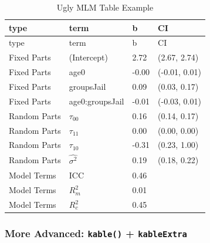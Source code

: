 \documentclass[]{article}
\newenvironment{Shaded}{\begin{snugshade}}{\end{snugshade}}
\newcommand{\KeywordTok}[1]{\textcolor[rgb]{0.13,0.29,0.53}{\textbf{#1}}}
\newcommand{\DataTypeTok}[1]{\textcolor[rgb]{0.13,0.29,0.53}{#1}}
\newcommand{\DecValTok}[1]{\textcolor[rgb]{0.00,0.00,0.81}{#1}}
\newcommand{\StringTok}[1]{\textcolor[rgb]{0.31,0.60,0.02}{#1}}
\newcommand{\CommentTok}[1]{\textcolor[rgb]{0.56,0.35,0.01}{\textit{#1}}}
\newcommand{\OperatorTok}[1]{\textcolor[rgb]{0.81,0.36,0.00}{\textbf{#1}}}
\newcommand{\NormalTok}[1]{#1}
\begin{document}
\begin{longtable}[]{@{}llll@{}}
\caption{Ugly MLM Table Example}\tabularnewline
\toprule
type & term & b & CI\tabularnewline
\midrule
\endfirsthead
\toprule
type & term & b & CI\tabularnewline
\midrule
\endhead
Fixed Parts & (Intercept) & 2.72 & (2.67, 2.74)\tabularnewline
Fixed Parts & age0 & -0.00 & (-0.01, 0.01)\tabularnewline
Fixed Parts & groupsJail & 0.09 & (0.03, 0.17)\tabularnewline
Fixed Parts & age0:groupsJail & -0.01 & (-0.03, 0.01)\tabularnewline
Random Parts & \(\tau_{00}\) & 0.16 & (0.14, 0.17)\tabularnewline
Random Parts & \(\tau_{11}\) & 0.00 & (0.00, 0.00)\tabularnewline
Random Parts & \(\tau_{10}\) & -0.31 & (0.23, 1.00)\tabularnewline
Random Parts & \(\hat{\sigma^2}\) & 0.19 & (0.18, 0.22)\tabularnewline
Model Terms & ICC & 0.46 &\tabularnewline
Model Terms & \(R^2_m\) & 0.01 &\tabularnewline
Model Terms & \(R^2_c\) & 0.45 &\tabularnewline
\bottomrule
\end{longtable}

\subsubsection{\texorpdfstring{More Advanced: \texttt{kable()} +
\texttt{kableExtra}}{More Advanced: kable() + kableExtra}}\label{more-advanced-kable-kableextra}

\small

\begin{Shaded}
\end{Shaded}
\end{document}

